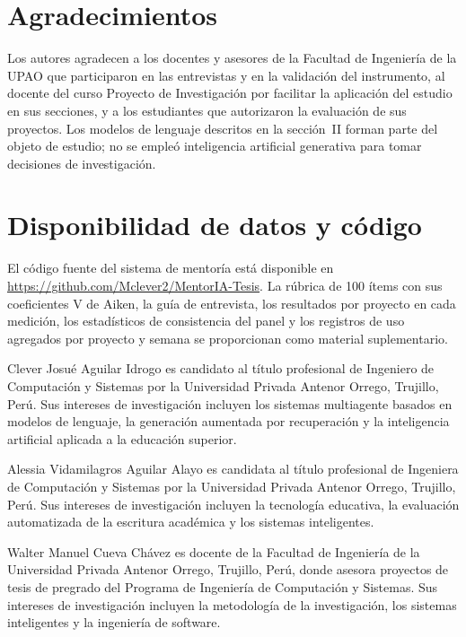 \documentclass[journal]{IEEEtran}
\begin{document}
\section*{Agradecimientos}

Los autores agradecen a los docentes y asesores de la Facultad de Ingeniería de la UPAO que participaron en las entrevistas y en la validación del instrumento, al docente del curso Proyecto de Investigación por facilitar la aplicación del estudio en sus secciones, y a los estudiantes que autorizaron la evaluación de sus proyectos. Los modelos de lenguaje descritos en la sección~II forman parte del objeto de estudio; no se empleó inteligencia artificial generativa para tomar decisiones de investigación.

\section*{Disponibilidad de datos y código}

El código fuente del sistema de mentoría está disponible en \url{https://github.com/Mclever2/MentorIA-Tesis}. La rúbrica de 100 ítems con sus coeficientes V de Aiken, la guía de entrevista, los resultados por proyecto en cada medición, los estadísticos de consistencia del panel y los registros de uso agregados por proyecto y semana se proporcionan como material suplementario.




\begin{IEEEbiographynophoto}{Clever Josu\'e Aguilar Idrogo}
es candidato al título profesional de Ingeniero de Computación y Sistemas por la Universidad Privada Antenor Orrego, Trujillo, Perú. Sus intereses de investigación incluyen los sistemas multiagente basados en modelos de lenguaje, la generación aumentada por recuperación y la inteligencia artificial aplicada a la educación superior.
\end{IEEEbiographynophoto}

\begin{IEEEbiographynophoto}{Alessia Vidamilagros Aguilar Alayo}
es candidata al título profesional de Ingeniera de Computación y Sistemas por la Universidad Privada Antenor Orrego, Trujillo, Perú. Sus intereses de investigación incluyen la tecnología educativa, la evaluación automatizada de la escritura académica y los sistemas inteligentes.
\end{IEEEbiographynophoto}

\begin{IEEEbiographynophoto}{Walter Manuel Cueva Ch\'avez}
es docente de la Facultad de Ingeniería de la Universidad Privada Antenor Orrego, Trujillo, Perú, donde asesora proyectos de tesis de pregrado del Programa de Ingeniería de Computación y Sistemas. Sus intereses de investigación incluyen la metodología de la investigación, los sistemas inteligentes y la ingeniería de software.
\end{IEEEbiographynophoto}
\end{document}
